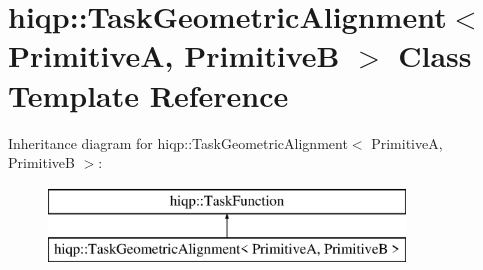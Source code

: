 \hypertarget{classhiqp_1_1TaskGeometricAlignment}{\section{hiqp\-:\-:Task\-Geometric\-Alignment$<$ Primitive\-A, Primitive\-B $>$ Class Template Reference}
\label{classhiqp_1_1TaskGeometricAlignment}
}
Inheritance diagram for hiqp\-:\-:Task\-Geometric\-Alignment$<$ Primitive\-A, Primitive\-B $>$\-:\begin{figure}[H]
\begin{center}
\leavevmode
\includegraphics[height=2.000000cm]{classhiqp_1_1TaskGeometricAlignment}
\end{center}
\end{figure}
